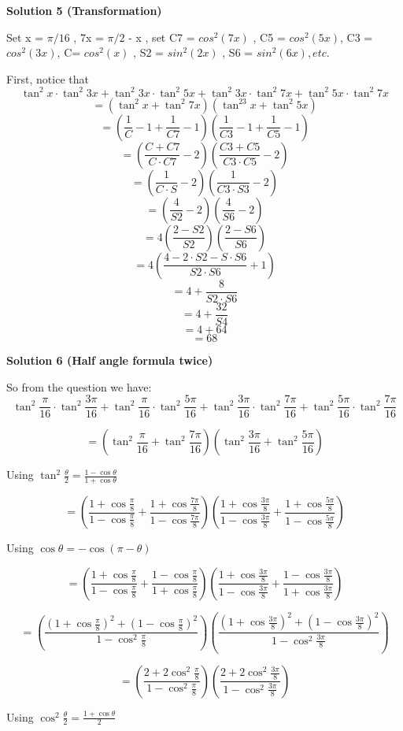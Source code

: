 \begin{enumerate}
\textbf{Solution 5 (Transformation)}

Set x = $\pi/16$  , 7x = $\pi/2$ - x , set C7 = $cos^2(7x)$ , C5 = $cos^2(5x)$, C3 = $cos^2(3x)$, C= $cos^2(x)$ , S2 = $sin^2(2x)$ , S6 = $sin^2(6x), etc.$

 First, notice that
 \[\tan^2 x \cdot \tan^2 3x + \tan^2 3x \cdot \tan^2 5x+\tan^2 3x \cdot \tan^2 7x+\tan^2 5x \cdot \tan^2 7x\]
 \[=(\tan^2x+\tan^2 7x)(\tan^23x+\tan^2 5x)\]
 \[=(\frac{1}{C} - 1 +\frac{1}{C7}-1)(\frac{1}{C3} - 1 +\frac{1}{C5}-1)\]
 \[=(\frac{C+C7}{C \cdot C7} -2)( \frac{C3+C5}{C3 \cdot C5} -2)\]
 \[=(\frac{1}{C \cdot S} -2)( \frac{1}{C3 \cdot S3} -2)\]
 \[=(\frac{4}{S2} -2)( \frac{4}{S6} -2)\]
 \[=4(\frac{2-S2}{S2})( \frac{2-S6}{S6})\]
 \[=4(\frac{4-2 \cdot S2-S \cdot S6 }{S2 \cdot S6}+1)\]
 \[=4 + \frac{8}{S2 \cdot S6}\]
 \[=4 + \frac{32}{S4}\]
 \[=4 +  64\] 
 \[= 68\]




\textbf{Solution 6 (Half angle formula twice)}

So from the question we have:
 \[\tan^2 \frac {\pi}{16} \cdot \tan^2 \frac {3\pi}{16} + \tan^2 \frac {\pi}{16} \cdot \tan^2 \frac {5\pi}{16}+\tan^2 \frac {3\pi}{16} \cdot \tan^2 \frac {7\pi}{16}+\tan^2 \frac {5\pi}{16} \cdot \tan^2 \frac {7\pi}{16}\]

 \[=(\tan^2\frac{\pi}{16}+\tan^2 \frac{7\pi}{16})(\tan^2\frac{3\pi}{16}+\tan^2 \frac{5\pi}{16})\]

 Using $\tan^2\frac{\theta}{2}=\frac{1-\cos\theta}{1+\cos\theta}$

 \[=(\frac{1+\cos\frac{\pi}{8}}{1-\cos\frac{\pi}{8}}+\frac{1+\cos\frac{7\pi}{8}}{1-\cos\frac{7\pi}{8}})(\frac{1+\cos\frac{3\pi}{8}}{1-\cos\frac{3\pi}{8}}+\frac{1+\cos\frac{5\pi}{8}}{1-\cos\frac{5\pi}{8}})\]

 Using $\cos\theta=-\cos(\pi-\theta)$

 \[=(\frac{1+\cos\frac{\pi}{8}}{1-\cos\frac{\pi}{8}}+\frac{1-\cos\frac{\pi}{8}}{1+\cos\frac{\pi}{8}})(\frac{1+\cos\frac{3\pi}{8}}{1-\cos\frac{3\pi}{8}}+\frac{1-\cos\frac{3\pi}{8}}{1+\cos\frac{3\pi}{8}})\]

 \[=(\frac{(1+\cos\frac{\pi}{8})^2+(1-\cos\frac{\pi}{8})^2}{1-\cos^2\frac{\pi}{8}})(\frac{(1+\cos\frac{3\pi}{8})^2+(1-\cos\frac{3\pi}{8})^2}{1-\cos^2\frac{3\pi}{8}})\]

 \[=(\frac{2+2\cos^2\frac{\pi}{8}}{1-\cos^2\frac{\pi}{8}})(\frac{2+2\cos^2\frac{3\pi}{8}}{1-\cos^2\frac{3\pi}{8}})\]

 Using $\cos^2\frac{\theta}{2}=\frac{1+\cos\theta}{2}$


\end{enumerate}
